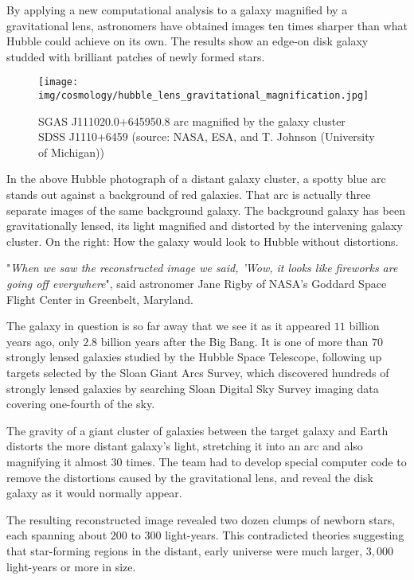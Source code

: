 	By applying a new computational analysis to a galaxy magnified by a gravitational lens, astronomers have obtained images ten times sharper than what Hubble could achieve on its own. The results show an edge-on disk galaxy studded with brilliant patches of newly formed stars.
	\begin{figure}[H]
		\centering
		\texttt{[image: img/cosmology/hubble\_lens\_gravitational\_magnification.jpg]}	
		\caption[]{SGAS J111020.0+645950.8 arc magnified by the galaxy cluster SDSS J1110+6459 (source: NASA, ESA, and T. Johnson (University of Michigan))}
	\end{figure}
	In the above Hubble photograph of a distant galaxy cluster, a spotty blue arc stands out against a background of red galaxies. That arc is actually three separate images of the same background galaxy. The background galaxy has been gravitationally lensed, its light magnified and distorted by the intervening galaxy cluster. On the right: How the galaxy would look to Hubble without distortions.
	
	"\textit{When we saw the reconstructed image we said, 'Wow, it looks like fireworks are going off everywhere}", said astronomer Jane Rigby of NASA's Goddard Space Flight Center in Greenbelt, Maryland.

	The galaxy in question is so far away that we see it as it appeared $11$ billion years ago, only $2.8$ billion years after the Big Bang. It is one of more than $70$ strongly lensed galaxies studied by the Hubble Space Telescope, following up targets selected by the Sloan Giant Arcs Survey, which discovered hundreds of strongly lensed galaxies by searching Sloan Digital Sky Survey imaging data covering one-fourth of the sky.	
	
	The gravity of a giant cluster of galaxies between the target galaxy and Earth distorts the more distant galaxy's light, stretching it into an arc and also magnifying it almost 30 times. The team had to develop special computer code to remove the distortions caused by the gravitational lens, and reveal the disk galaxy as it would normally appear.
	
	The resulting reconstructed image revealed two dozen clumps of newborn stars, each spanning about $200$ to $300$ light-years. This contradicted theories suggesting that star-forming regions in the distant, early universe were much larger, $3,000 $light-years or more in size.
	

